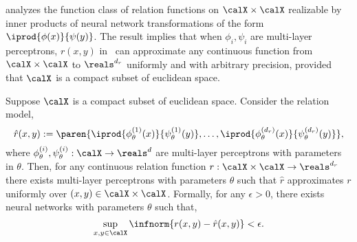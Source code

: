 
\citep{arxivInnerprodUnivApprox} analyzes the function class of relation functions on $\calX \times \calX$ realizable by inner products of neural network transformations of the form $\iprod{\phi(x)}{\psi(y)}$. The result implies that when $\phi_i, \psi_i$ are multi-layer perceptrons, $r(x,y)$ in~ can approximate any continuous function from $\calX \times \calX$ to $\reals^{d_r}$ uniformly and with arbitrary precision, provided that $\calX$ is a compact subset of euclidean space.

\begin{theorem}
    Suppose $\calX$ is a compact subset of euclidean space. Consider the relation model,
    \begin{equation*}
        \hat{r}(x, y) := \paren{\iprod{\phi_\theta^{(1)}(x)}{\psi_\theta^{(1)}(y)}, \ldots, \iprod{\phi_\theta^{(d_r)}(x)}{\psi_\theta^{(d_r)}(y)}},
    \end{equation*}
    \noindent where $\phi_\theta^{(i)}, \psi_\theta^{(i)}: \calX \to \reals^d$ are multi-layer perceptrons with parameters in $\theta$. Then, for any continuous relation function $r: \calX \times \calX \to \reals^{d_r}$ there exists multi-layer perceptrons with parameters $\theta$ such that $\hat{r}$ approximates $r$ uniformly over $(x,y) \in \calX \times \calX$. Formally, for any $\epsilon > 0$, there exists neural networks with parameters $\theta$ such that,
    \begin{equation*}
        \sup_{x, y \in \calX} \infnorm{r(x,y) - \hat{r}(x,y)} < \epsilon.
    \end{equation*}
\end{theorem}